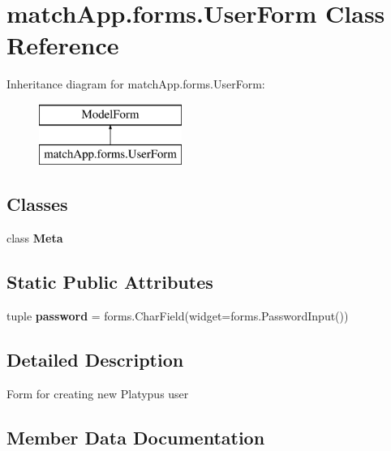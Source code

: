 \section{match\+App.\+forms.\+User\+Form Class Reference}
\label{classmatch_app_1_1forms_1_1_user_form}
Inheritance diagram for match\+App.\+forms.\+User\+Form\+:\begin{figure}[H]
\begin{center}
\leavevmode
\includegraphics[height=2.000000cm]{classmatch_app_1_1forms_1_1_user_form}
\end{center}
\end{figure}
\subsection*{Classes}
\begin{DoxyCompactItemize}
\item 
class {\bf Meta}
\end{DoxyCompactItemize}
\subsection*{Static Public Attributes}
\begin{DoxyCompactItemize}
\item 
tuple {\bf password} = forms.\+Char\+Field(widget=forms.\+Password\+Input())
\end{DoxyCompactItemize}


\subsection{Detailed Description}
\begin{DoxyVerb}Form for creating new Platypus user\end{DoxyVerb}
 

\subsection{Member Data Documentation}
